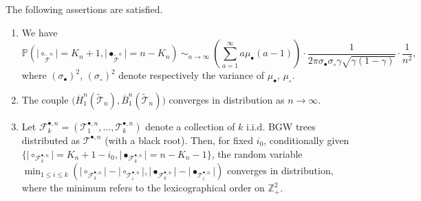 \documentclass[10pt]{amsart}
\theoremstyle{definition}\newtheorem{defi}[theo]{Definition}\newtheorem{rema}[theo]{Remark}\newtheorem{exam}[theo]{Example}\newtheorem{exem}[theo]{Example}\newtheorem{nota}[theo]{Notation}
\providecommand{\abs}[1]{\lvert#1\rvert}
\newcommand{\Z}{\mathbb{Z}}
\def\sc{\sigma_{\circ}}
\def\sb{\sigma_{\bullet}}
\def\mub{\mu_{\bullet}}
\def\muc{\mu_{\circ}}
\def\oB{\overline{B}}
\def\oH{\overline{H}}
\def\tTs{\tilde{\Ts}}
\def \Tsbn{\Ts^{\bullet,n}}
\def\Ts{\mathscr{T}}
\renewcommand\Pr[1]{\mathbb{P}\left(#1\right)}
\begin{document}
\begin{lemma}\label{lem:tilde}The following assertions are satisfied.
\begin{enumerate}
\item[(i)] We have
\[\Pr{\abs{\circ_{\tTs^{n}}}=K_{n}+1, \abs{\bullet_{\tTs^{n}}}=n-K_{n}}   \ \mathop{\sim}_{n \rightarrow \infty} \ \left( \sum_{a=1}^{\infty} a \mub(a-1) \right)\cdot \frac{1}{ 2\pi \sb \sc  \gamma \sqrt{\gamma(1-\gamma)} } \cdot \frac{1}{n^{2}},\]
where $(\sb)^{2}$, $(\sc)^{2}$ denote respectively the variance of $\mub$, $\muc$.
\item[(ii)] The couple $\big(\oH^{n}_{1}(\tTs_{n}),\oB^{n}_{1}(\tTs_{n})\big)$ converges in distribution as $n \rightarrow \infty$.
\item[(iii)] Let  $ \mathscr{F}^{\bullet,n}_{k} =(\Ts^{\bullet,n}_{1}, \ldots, \Ts^{\bullet,n}_{k})$ denote a collection of $k$ i.i.d. BGW trees distributed as  $ \Tsbn$ (with a black root). Then, for fixed $i_{0}$, conditionally given $ \{ \abs{\circ_{\mathscr{F}^{\bullet,n}_{k}}}=K_{n}+1-i_{0},\abs{\bullet_{\mathscr{F}^{\bullet,n}_{k}}}=n-K_{n}-1 \} $, the random variable $ \min_{1 \leq i \leq k} (\abs{\circ_{\mathscr{F}^{\bullet,n}_{k}}}- \abs{\circ_{\Ts^{\bullet,n}_{i}}},\abs{\bullet_{\mathscr{F}^{\bullet,n}_{k}}}- \abs{\bullet_{\Ts^{\bullet,n}_{i}}})$ converges in distribution, where the minimum refers to the lexicographical order on $\Z_{+}^{2}$.
\end{enumerate}
\end{lemma}
\end{document}

